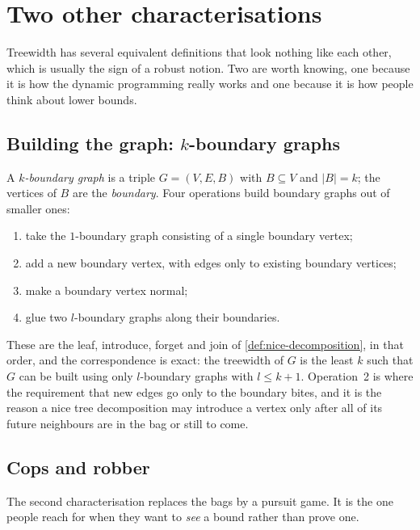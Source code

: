 \section{Two other characterisations}
\label{sec:tw-characterisations}

Treewidth has several equivalent definitions that look nothing like each other,
which is usually the sign of a robust notion. Two are worth knowing, one because
it is how the dynamic programming really works and one because it is how people
think about lower bounds.

\subsection{\texorpdfstring{Building the graph: $k$-boundary graphs}{Building the graph: k-boundary graphs}}

A \emph{$k$-boundary graph} is a triple $G = (V,E,B)$ with $B \subseteq V$ and
$|B| = k$; the vertices of $B$ are the \emph{boundary}. Four operations build
boundary graphs out of smaller ones:
\begin{enumerate}[leftmargin=*,nosep]
  \item take the $1$-boundary graph consisting of a single boundary vertex;
  \item add a new boundary vertex, with edges only to existing boundary
        vertices;
  \item make a boundary vertex normal;
  \item glue two $l$-boundary graphs along their boundaries.
\end{enumerate}
These are the leaf, introduce, forget and join of
\cref{def:nice-decomposition}, in that order, and the correspondence is exact:
the treewidth of $G$ is the least $k$ such that $G$ can be built using only
$l$-boundary graphs with $l \le k+1$. Operation~2 is where the requirement that
new edges go only to the boundary bites, and it is the reason a nice tree
decomposition may introduce a vertex only after all of its future neighbours
are in the bag or still to come.

\subsection{Cops and robber}

The second characterisation replaces the bags by a pursuit game. It is the one
people reach for when they want to \emph{see} a bound rather than prove one.

